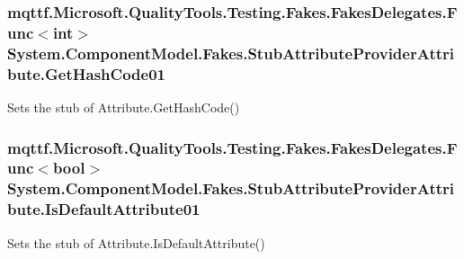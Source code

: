 \hypertarget{class_system_1_1_component_model_1_1_fakes_1_1_stub_attribute_provider_attribute_a40ce49a5d9f2afae1b849455e4b6887d}{
\subsubsection[{Get\-Hash\-Code01}]{\setlength{\rightskip}{0pt plus 5cm}mqttf.\-Microsoft.\-Quality\-Tools.\-Testing.\-Fakes.\-Fakes\-Delegates.\-Func$<$int$>$ System.\-Component\-Model.\-Fakes.\-Stub\-Attribute\-Provider\-Attribute.\-Get\-Hash\-Code01}}\label{class_system_1_1_component_model_1_1_fakes_1_1_stub_attribute_provider_attribute_a40ce49a5d9f2afae1b849455e4b6887d}


Sets the stub of Attribute.\-Get\-Hash\-Code()

\hypertarget{class_system_1_1_component_model_1_1_fakes_1_1_stub_attribute_provider_attribute_adc463ddf69bfc695a5014b4819eab244}{
\subsubsection[{Is\-Default\-Attribute01}]{\setlength{\rightskip}{0pt plus 5cm}mqttf.\-Microsoft.\-Quality\-Tools.\-Testing.\-Fakes.\-Fakes\-Delegates.\-Func$<$bool$>$ System.\-Component\-Model.\-Fakes.\-Stub\-Attribute\-Provider\-Attribute.\-Is\-Default\-Attribute01}}\label{class_system_1_1_component_model_1_1_fakes_1_1_stub_attribute_provider_attribute_adc463ddf69bfc695a5014b4819eab244}


Sets the stub of Attribute.\-Is\-Default\-Attribute()

